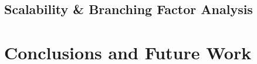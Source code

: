 \documentclass[conference]{IEEEtran}
\begin{document}

\subsection{Scalability \& Branching Factor Analysis}




\section{Conclusions and Future Work}
\label{sec:conclusions}






\end{document}
